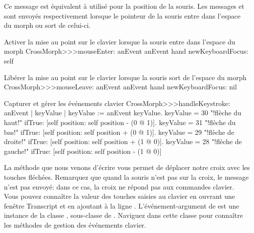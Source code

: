 \documentclass[a4paper,10pt,twoside]{book}
\begin{document}
\noindent
Ce message est équivalent à 
utilisé pour la position de la souris.
Les messages  et
 sont envoyés respectivement lorsque le
pointeur de la souris entre dans l'espace du morph ou sort de celui-ci.

\begin{method}{Activer la mise au point sur le clavier lorsque la souris entre dans l'espace du morph}
CrossMorph>>>mouseEnter: anEvent
	anEvent hand newKeyboardFocus: self
\end{method}

\begin{method}{Libérer la mise au point sur le clavier lorsque la souris sort de l'espace du morph}
CrossMorph>>>mouseLeave: anEvent
	anEvent hand newKeyboardFocus: nil
\end{method}

\begin{method}[handleKeystroke]{Capturer et gérer les événements clavier}
CrossMorph>>>handleKeystroke: anEvent
	| keyValue |
	keyValue := anEvent keyValue.
	keyValue = 30	 "!flèche du haut!"
		ifTrue: [self position: self position - (0 @ 1)].
	keyValue = 31	 "!flèche du bas!"
		ifTrue: [self position: self position + (0 @ 1)].
	keyValue = 29	 "!flèche de droite!"
		ifTrue: [self position: self position + (1 @ 0)].
	keyValue = 28	 "!flèche de gauche!"
		ifTrue: [self position: self position - (1 @ 0)]
\end{method}

La méthode que nous venons d'écrire vous permet de déplacer
notre croix avec les touches fléchées. Remarquez que quand la
souris n'est pas sur la croix, le message
 n'est pas envoyé: dans ce cas, la croix
ne répond pas aux commandes clavier.
Vous pouvez connaître la valeur des touches saisies au clavier en
ouvrant une fenêtre Transcript et en ajoutant à 
 la ligne 
 .
L'événement-argument  de  est une
instance de la classe , sous-classe de
. Naviguez dans cette classe pour connaître les
méthodes de gestion des événements clavier.

\end{document}
